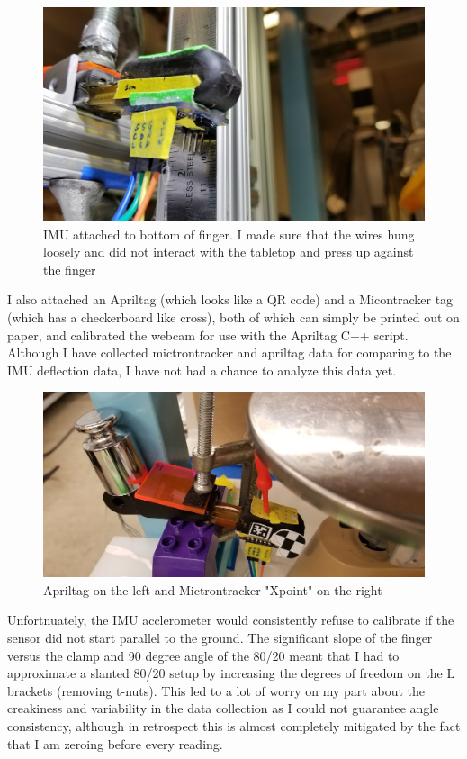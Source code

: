\documentclass[preprint,12pt,3p]{elsarticle}
\begin{document}
\begin{figure}[H]
\centering
\includegraphics[width=.5\textwidth]{images/setup/IMU.jpg}
\caption{IMU attached to bottom of finger. I made sure that the wires hung
loosely and did not interact with the tabletop and  press up against the finger}
\end{figure}

I also attached an Apriltag (which looks like a QR code) and a Micontracker tag (which has a
checkerboard like cross), both of which can simply be printed out on paper, and calibrated the
webcam for use with the Apriltag C++ script. Although I have collected mictrontracker and apriltag
data for comparing to the IMU deflection data, I have not had a chance to
analyze this data yet.

\begin{figure}[H]
\centering
\includegraphics[width=.6\textwidth]{images/setup/microntracker_template.jpg}
\caption{Apriltag on the left and Mictrontracker "Xpoint" on the right}
\end{figure}

Unfortnuately, the IMU acclerometer would consistently refuse to calibrate if the sensor did not
start parallel to the ground. The significant slope of the finger versus the clamp and 90 degree
angle of the 80/20 meant that I had to approximate a slanted 80/20 setup by increasing the degrees
of freedom on the L brackets (removing t-nuts). This led to a lot of worry on my part about the
creakiness and variability in the data collection as I could not guarantee angle consistency,
although in retrospect this is almost completely mitigated by the fact that I am zeroing before
every reading. 
\end{document}
